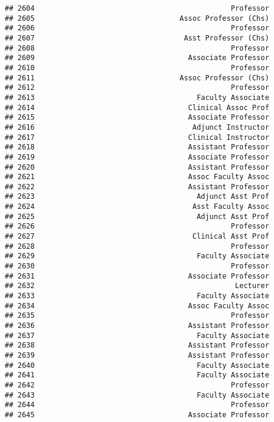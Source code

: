 \documentclass[
]{article}
\begin{document}
\begin{verbatim}
## 2604                                              Professor
## 2605                                  Assoc Professor (Chs)
## 2606                                              Professor
## 2607                                   Asst Professor (Chs)
## 2608                                              Professor
## 2609                                    Associate Professor
## 2610                                              Professor
## 2611                                  Assoc Professor (Chs)
## 2612                                              Professor
## 2613                                      Faculty Associate
## 2614                                    Clinical Assoc Prof
## 2615                                    Associate Professor
## 2616                                     Adjunct Instructor
## 2617                                    Clinical Instructor
## 2618                                    Assistant Professor
## 2619                                    Associate Professor
## 2620                                    Assistant Professor
## 2621                                    Assoc Faculty Assoc
## 2622                                    Assistant Professor
## 2623                                      Adjunct Asst Prof
## 2624                                     Asst Faculty Assoc
## 2625                                      Adjunct Asst Prof
## 2626                                              Professor
## 2627                                     Clinical Asst Prof
## 2628                                              Professor
## 2629                                      Faculty Associate
## 2630                                              Professor
## 2631                                    Associate Professor
## 2632                                               Lecturer
## 2633                                      Faculty Associate
## 2634                                    Assoc Faculty Assoc
## 2635                                              Professor
## 2636                                    Assistant Professor
## 2637                                      Faculty Associate
## 2638                                    Assistant Professor
## 2639                                    Assistant Professor
## 2640                                      Faculty Associate
## 2641                                      Faculty Associate
## 2642                                              Professor
## 2643                                      Faculty Associate
## 2644                                              Professor
## 2645                                    Associate Professor

\end{verbatim}
\end{document}
